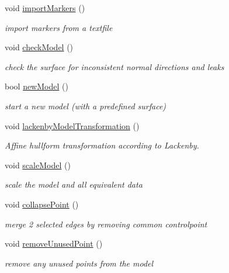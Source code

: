 \begin{DoxyCompactItemize}
void \hyperlink{classShipCAD_1_1Controller_a3f61864f54c59f0f4d9df19824eb387b}{import\-Markers} ()
\begin{DoxyCompactList}\small\item\em import markers from a textfile \end{DoxyCompactList}\item 
void \hyperlink{classShipCAD_1_1Controller_a8e6d827b35a5aa295fc455e64e458f84}{check\-Model} ()
\begin{DoxyCompactList}\small\item\em check the surface for inconsistent normal directions and leaks \end{DoxyCompactList}\item 
bool \hyperlink{classShipCAD_1_1Controller_a129f26196db49a371b747f9e58358b88}{new\-Model} ()
\begin{DoxyCompactList}\small\item\em start a new model (with a predefined surface) \end{DoxyCompactList}\item 
void \hyperlink{classShipCAD_1_1Controller_a1008c0cde2f16e883fbe6a07850ba670}{lackenby\-Model\-Transformation} ()
\begin{DoxyCompactList}\small\item\em Affine hullform transformation according to Lackenby. \end{DoxyCompactList}\item 
void \hyperlink{classShipCAD_1_1Controller_aca7415d01ad863a7dabc8260d9f868fe}{scale\-Model} ()
\begin{DoxyCompactList}\small\item\em scale the model and all equivalent data \end{DoxyCompactList}\item 
void \hyperlink{classShipCAD_1_1Controller_a014673c39abcced0285f8df64842918e}{collapse\-Point} ()
\begin{DoxyCompactList}\small\item\em merge 2 selected edges by removing common controlpoint \end{DoxyCompactList}\item 
void \hyperlink{classShipCAD_1_1Controller_a42d9eb4cf3864ca9057bfa45c1c80d40}{remove\-Unused\-Point} ()
\begin{DoxyCompactList}\small\item\em remove any unused points from the model \end{DoxyCompactList}\item 

\end{DoxyCompactItemize}
